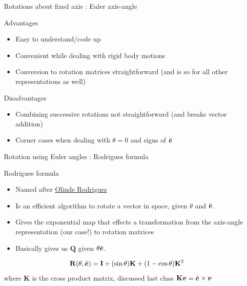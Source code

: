 \documentclass[presentation]{beamer}
\newcommand{\gv}[1]{\ensuremath{\mbox{\boldmath$ #1 $}}}
\newcommand{\bv}[1]{\ensuremath{\mathbf{#1}}}
\begin{document}
\begin{frame}[label={sec:orgebdaf9f}]{Rotations about fixed axis : Euler axis-angle}
\begin{block}{Advantages}
\begin{itemize}
\item Easy to understand/code up
\item Convenient while dealing with rigid body motions
\item Conversion to rotation matrices straightforward (and is so for all other
representations as well)
\end{itemize}
\end{block}
\begin{block}{Disadvantages}
\begin{itemize}
\item Combining successive rotations not straightforward (and breaks vector addition)
\item Corner cases when dealing with \(\theta = 0\) and signs of \(\hat{\gv{e}}\)
\end{itemize}
\end{block}
\end{frame}
\begin{frame}[label={sec:orgba96284}]{Rotation using Euler angles : Rodrigues formula}
\begin{block}{Rodrigues formula}
\begin{itemize}
\item Named after \href{https://en.wikipedia.org/wiki/Olinde\_Rodrigues}{Olinde Rodrigues}
\item Is an efficient algorithm to rotate a vector in space, given \(\theta\)
and \(\hat{\gv{e}}\).
\item Gives the exponential map that effects a transformation from the
axis-angle representation (our case!) to rotation matrices
\item Basically gives us \(\bv{Q}\) given \(\theta \hat{\gv{e}}\).
\end{itemize}
\[ \mathbf {R}(\theta, \hat{\gv{e}}) =\mathbf {I} +(\sin \theta )\mathbf {K} +(1-\cos \theta )\mathbf {K} ^{2} \]
where \(\mathbf{K}\) is the cross product matrix, discussed last class \(\mathbf{K}\gv{v} = \hat{\gv{e}} \times \gv{v}\)
\end{block}
\end{frame}
\end{document}

